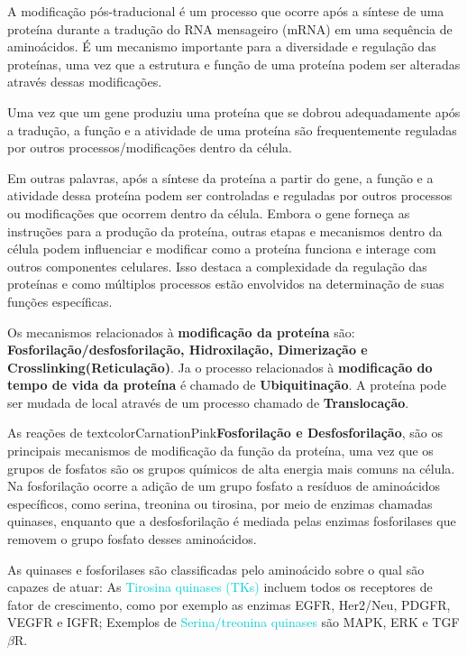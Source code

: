 \documentclass[11pt,a4paper]{article}
\newcounter{exemplo}
\begin{document}
		A modificação pós-traducional é um processo que ocorre após a síntese de uma proteína durante a tradução do RNA mensageiro (mRNA) em uma sequência de aminoácidos. É um mecanismo importante para a diversidade e regulação das proteínas, uma vez que a estrutura e função de uma proteína podem ser alteradas através dessas modificações.

		Uma vez que um gene produziu uma proteína que se dobrou adequadamente após a tradução, a função e a atividade de uma proteína são frequentemente reguladas por outros processos/modificações dentro da célula.

		Em outras palavras, após a síntese da proteína a partir do gene, a função e a atividade dessa proteína podem ser controladas e reguladas por outros processos ou modificações que ocorrem dentro da célula. Embora o gene forneça as instruções para a produção da proteína, outras etapas e mecanismos dentro da célula podem influenciar e modificar como a proteína funciona e interage com outros componentes celulares. Isso destaca a complexidade da regulação das proteínas e como múltiplos processos estão envolvidos na determinação de suas funções específicas.

		Os mecanismos relacionados à \textcolor{CarnationPink}{\textbf{modificação da proteína}} são: \textbf{Fosforilação/desfosforilação, Hidroxilação, Dimerização e Crosslinking(Reticulação)}. Ja o processo relacionados à \textcolor{CarnationPink}{\textbf{modificação do tempo de vida da proteína}} é chamado de \textbf{Ubiquitinação}. A proteína pode ser mudada de local através de um processo chamado de \textbf{Translocação}.
		
		As reações de textcolor{CarnationPink}{\textbf{Fosforilação e Desfosforilação}}, são os principais mecanismos de modificação da função da proteína, uma vez que os grupos de fosfatos são os grupos químicos de alta energia mais comuns na célula. Na fosforilação ocorre a adição de um grupo fosfato a resíduos de aminoácidos específicos, como serina, treonina ou tirosina, por meio de enzimas chamadas quinases, enquanto que a desfosforilação é mediada pelas enzimas fosforilases que removem o grupo fosfato desses aminoácidos.

		As quinases e fosforilases são classificadas pelo aminoácido sobre o qual são capazes de atuar: As \textcolor{DarkTurquoise}{Tirosina quinases (TKs)}  incluem todos os receptores de fator de crescimento, como por exemplo as enzimas EGFR, Her2/Neu, PDGFR, VEGFR e IGFR; Exemplos de \textcolor{DarkTurquoise}{Serina/treonina quinases} são MAPK, ERK e TGF$\beta$R.
\end{document}
